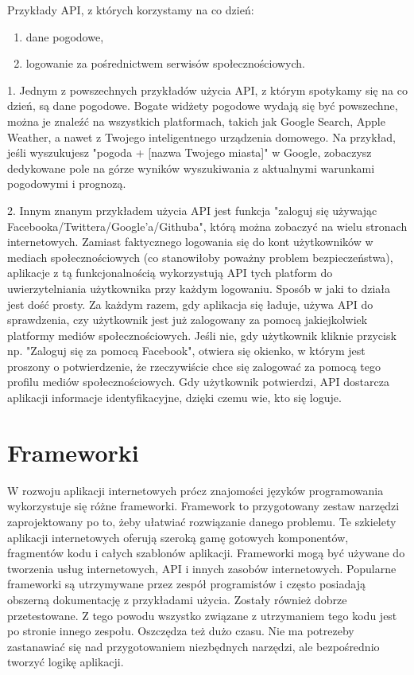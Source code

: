 Przykłady API, z których korzystamy na co dzień:
\begin{enumerate}
\item dane pogodowe,
\item logowanie za pośrednictwem serwisów społecznościowych.
\end{enumerate}




1. Jednym z powszechnych przykładów użycia API, z którym spotykamy się na co dzień, są dane pogodowe. Bogate widżety pogodowe wydają się być powszechne, można je znaleźć na wszystkich platformach, takich jak Google Search, Apple Weather, a nawet z Twojego inteligentnego urządzenia domowego. Na przykład, jeśli wyszukujesz "pogoda + [nazwa Twojego miasta]" w Google, zobaczysz dedykowane pole na górze wyników wyszukiwania z aktualnymi warunkami pogodowymi i prognozą.


2. Innym znanym przykładem użycia API jest funkcja "zaloguj się używając Facebooka/Twittera/Google'a/Githuba", którą można zobaczyć na wielu stronach internetowych. Zamiast faktycznego logowania się do kont użytkowników w mediach społecznościowych (co stanowiłoby poważny problem bezpieczeństwa), aplikacje z tą funkcjonalnością wykorzystują API tych platform do uwierzytelniania użytkownika przy każdym logowaniu. Sposób w jaki to działa jest dość prosty. Za każdym razem, gdy aplikacja się ładuje, używa API do sprawdzenia, czy użytkownik jest już zalogowany za pomocą jakiejkolwiek platformy mediów społecznościowych. Jeśli nie, gdy użytkownik kliknie przycisk np. "Zaloguj się za pomocą Facebook", otwiera się okienko, w którym jest proszony o potwierdzenie, że rzeczywiście chce się zalogować za pomocą tego profilu mediów społecznościowych. Gdy użytkownik potwierdzi, API dostarcza aplikacji informacje identyfikacyjne, dzięki czemu wie, kto się loguje.

\section{Frameworki}
W rozwoju aplikacji internetowych prócz znajomości języków programowania wykorzystuje się różne frameworki. Framework to przygotowany zestaw narzędzi zaprojektowany po to, żeby ułatwiać rozwiązanie danego problemu. Te szkielety aplikacji internetowych oferują szeroką gamę gotowych komponentów, fragmentów kodu i całych szablonów aplikacji. Frameworki mogą być używane do tworzenia usług internetowych, API i innych zasobów internetowych. 
Popularne frameworki są utrzymywane przez zespół programistów i często posiadają obszerną dokumentację z przykładami użycia. Zostały również dobrze przetestowane. Z tego powodu wszystko związane z utrzymaniem tego kodu jest po stronie innego zespołu. Oszczędza też dużo czasu. Nie ma potrezeby zastanawiać się nad przygotowaniem niezbędnych narzędzi, ale bezpośrednio tworzyć logikę aplikacji.

